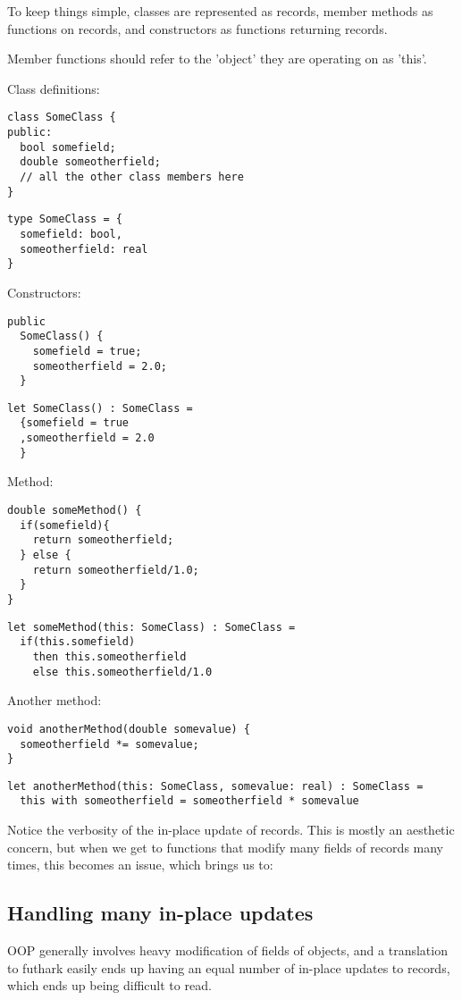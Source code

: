 To keep things simple, classes are represented as records, member methods as functions on records, and constructors as functions returning records.

Member functions should refer to the 'object' they are operating on as 'this'.

Class definitions:
\begin{verbatim}
class SomeClass {
public:
  bool somefield;
  double someotherfield;
  // all the other class members here
}
\end{verbatim}

\begin{verbatim}
type SomeClass = {
  somefield: bool,
  someotherfield: real
}
\end{verbatim}

Constructors:
\begin{verbatim}
public
  SomeClass() {
    somefield = true;
    someotherfield = 2.0;
  }
\end{verbatim}

\begin{verbatim}
let SomeClass() : SomeClass =
  {somefield = true
  ,someotherfield = 2.0
  }
\end{verbatim}

Method:
\begin{verbatim}
double someMethod() {
  if(somefield){
    return someotherfield;
  } else {
    return someotherfield/1.0;
  }
}
\end{verbatim}
\begin{verbatim}
let someMethod(this: SomeClass) : SomeClass =
  if(this.somefield)
    then this.someotherfield
    else this.someotherfield/1.0
\end{verbatim}

Another method:
\begin{verbatim}
void anotherMethod(double somevalue) {
  someotherfield *= somevalue;
}
\end{verbatim}
\begin{verbatim}
let anotherMethod(this: SomeClass, somevalue: real) : SomeClass =
  this with someotherfield = someotherfield * somevalue
\end{verbatim}

Notice the verbosity of the in-place update of records. This is mostly an aesthetic concern, but when we get to functions that modify many fields of records many times, this becomes an issue, which brings us to:

\subsection{Handling many in-place updates}
OOP generally involves heavy modification of fields of objects, and a translation to futhark easily ends up having an equal number of in-place updates to records, which ends up being difficult to read.

